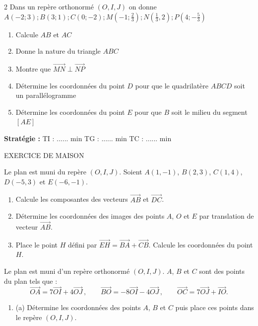 \begin{multicols*}{2}
  	 Dans un repère orthonormé $(O, I, J)$ on donne
  	$A(-2; 3); B(3; 1); C(0; -2); M(-1; \frac{2}{3}); N(\frac{1}{3}, 2); P(4; -\frac{5}{3})$
  	\begin{enumerate}
  		\item Calcule $AB$ et $AC$
  		\item Donne la nature du triangle $ABC$
  		\item Montre que $\overrightarrow{MN} \perp \overrightarrow{NP}$
  		\item Détermine les coordonnées du point $ D $ pour que le quadrilatère $ABCD $ soit un parallélogramme 
  		\end{enumerate}
  		\newpage
  			\begin{enumerate}
  				\setcounter{enumi}{4}
  		\item Détermine les coordonnées du point $ E $ pour que $ B $ soit le milieu du segment $ [AE] $
  	\end{enumerate}
  	\textbf{Stratégie :} TI : ...... min \quad TG : ...... min \quad TC : ...... min	
  	\begin{center}
  		EXERCICE DE MAISON
  	\end{center}
  	Le plan est muni du repère $(O,I,J)$. Soient $A(1,-1)$, $B(2,3)$, $C(1,4)$, $D(-5,3)$ et $E(-6,-1)$.
  	\begin{enumerate}
  		\item Calcule les composantes des vecteurs $\overrightarrow{AB}$ et $\overrightarrow{DC}$.
  		\item Détermine les coordonnées des images des points $A$, $O$ et $E$ par translation de vecteur $\overrightarrow{AB}$.
  		\item Place le point $H$ défini par $\overrightarrow{EH} = \overrightarrow{BA} + \overrightarrow{CB}$.
  		Calcule les coordonnées du point $H$.
  	\end{enumerate}
  	 Le plan est muni d'un repère orthonormé $(O,I,J)$. $A$, $B$ et $C$ sont des points du plan tels que :
  	$$\overrightarrow{OA} = 7\overrightarrow{OI}+4\overrightarrow{OJ}\,, \qquad \overrightarrow{BO} = -8\overrightarrow{OI}-4\overrightarrow{OJ}\,, \qquad \overrightarrow{OC} = 7\overrightarrow{OJ}+\overrightarrow{IO}.$$
  	\begin{enumerate}
  		\item[1.] (a) Détermine les coordonnées des points $A$, $B$ et $C$ puis place ces points dans le repère $(O,I,J)$.
  		

\end{enumerate}
\end{multicols*}
